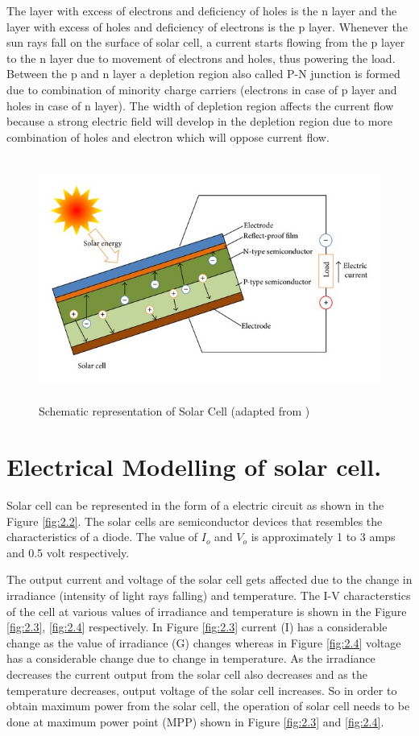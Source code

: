 \documentclass[a4paper,12pt]{iitmdiss}
\begin{document}
The layer with excess of electrons and deficiency of holes is the n layer and the layer with excess of holes and deficiency of electrons is the p layer. Whenever the sun rays fall on the surface of solar cell, a current starts flowing from the p layer to the n layer due to movement of electrons and holes, thus powering the load. Between the p and n layer a depletion region also called P-N junction is formed due to combination of minority charge carriers (electrons in case of p layer and holes in case of n layer). The width of depletion region affects the current flow because a strong electric field will develop in the depletion region due to more combination of holes and electron which will oppose current flow. 

\begin{figure}[hbt!]
    \centering
    \includegraphics[height=8cm,width=15cm]{Schematic-operating-principle-of-a-PV-solar-cell-adapted-from-22.jpg}
    \caption{Schematic representation of Solar Cell (adapted from \textcolor{blue}{\cite{zhang2014photovoltaics,stevenson53slimmer}})}
    \label{fig:2.1}
\end{figure}


\section{Electrical Modelling of solar cell.}
Solar cell can be represented in the form of a electric circuit as shown in the Figure \ref{fig:2.2}. The solar cells are semiconductor devices that resembles the characteristics of a diode. The value of $I_o$ and $V_o$ is approximately 1 to 3 amps and 0.5 volt respectively.

The output current and voltage of the solar cell gets affected due to the change in irradiance (intensity of light rays falling) and temperature. The I-V characterstics of the cell at various values of irradiance and temperature is shown in the Figure \ref{fig:2.3}, \ref{fig:2.4} respectively. In Figure \ref{fig:2.3} current (I) has a considerable change as the value of irradiance (G) changes whereas in Figure \ref{fig:2.4} voltage has a considerable change due to change in temperature. As the irradiance decreases the current output from the solar cell also decreases and as the temperature decreases, output voltage of the solar cell increases. So in order to obtain maximum power from the solar cell, the operation of solar cell needs to be done at maximum power point (MPP) shown in Figure \ref{fig:2.3} and \ref{fig:2.4}.
\end{document}
